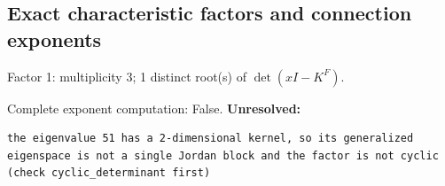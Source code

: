 \documentclass[10pt,a4paper]{article}
\newcommand{\fitmath}[1]{\sbox{\mathbox}{$\displaystyle #1$}\ifdim\wd\mathbox>\linewidth\resizebox{\linewidth}{!}{\usebox{\mathbox}}\else\usebox{\mathbox}\fi}
\begin{document}
\subsection*{Exact characteristic factors and connection exponents}
Factor 1: multiplicity 3; 1 distinct root(s) of $\det(xI-K^F)$.
\begin{center}\fitmath{\begin{aligned}p_{1}(x)&=x - 51\end{aligned}}\end{center}
Complete exponent computation: False.
\textbf{Unresolved:}

\begin{lstlisting}
the eigenvalue 51 has a 2-dimensional kernel, so its generalized eigenspace is not a single Jordan block and the factor is not cyclic (check cyclic_determinant first)
\end{lstlisting}
\end{document}
